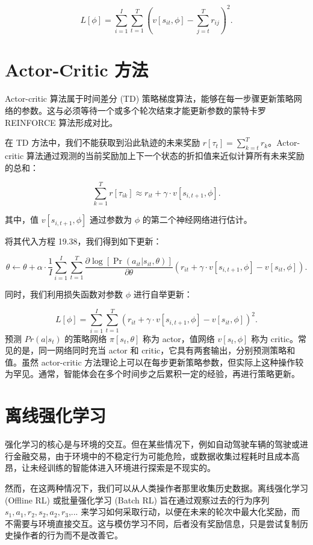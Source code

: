 \[
L[\phi] = \sum_{i=1}^{I} \sum_{t=1}^{T} \left( v[s_{it}, \phi] - \sum_{j=t}^{T} r_{ij} \right)^2. \tag{19.39}
\]

\section{Actor-Critic 方法}
Actor-critic 算法属于时间差分 (TD) 策略梯度算法，能够在每一步骤更新策略网络的参数。这与必须等待一个或多个轮次结束才能更新参数的蒙特卡罗 REINFORCE 算法形成对比。

在 TD 方法中，我们不能获取到沿此轨迹的未来奖励 \(r[\tau_t] = \sum_{k=t}^T r_k\)。Actor-critic 算法通过观测的当前奖励加上下一个状态的折扣值来近似计算所有未来奖励的总和：

\[
\sum_{k=1}^{T} r[\tau_{ik}] \approx r_{it} + \gamma \cdot v[s_{i,t+1}, \phi]. \tag{19.40}
\]

其中，值 \(v[s_{i,t+1}, \phi]\) 通过参数为 \(\phi\) 的第二个神经网络进行估计。

将其代入方程 19.38，我们得到如下更新：

\[
\theta \leftarrow \theta + \alpha \cdot \frac{1}{I} \sum_{i=1}^{I} \sum_{t=1}^{T} \frac{\partial \log[\Pr(a_{it}|s_{it}, \theta)]}{\partial \theta} (r_{it} + \gamma \cdot v[s_{i,t+1}, \phi] - v[s_{it}, \phi]). \tag{19.41}
\]

同时，我们利用损失函数对参数 \(\phi\) 进行自举更新：

\[
L[\phi] = \sum_{i=1}^{I} \sum_{t=1}^{T} \left( r_{it} + \gamma \cdot v[s_{i,t+1}, \phi] - v[s_{it}, \phi] \right)^2. \tag{19.42}
\]
预测 \(Pr(a|s_t)\) 的策略网络 \(\pi[s_t,\theta]\) 称为 actor，值网络 \(v[s_t,\phi]\) 称为 critic。常见的是，同一网络同时充当 actor 和 critic，它具有两套输出，分别预测策略和值。虽然 actor-critic 方法理论上可以在每步更新策略参数，但实际上这种操作较为罕见。通常，智能体会在多个时间步之后累积一定的经验，再进行策略更新。

\section{离线强化学习}
强化学习的核心是与环境的交互。但在某些情况下，例如自动驾驶车辆的驾驶或进行金融交易，由于环境中的不稳定行为可能危险，或数据收集过程耗时且成本高昂，让未经训练的智能体进入环境进行探索是不现实的。

然而，在这两种情况下，我们可以从人类操作者那里收集历史数据。离线强化学习 (Offline RL) 或批量强化学习 (Batch RL) 旨在通过观察过去的行为序列 \(s_1,a_1,r_2,s_2,a_2,r_3\),... 来学习如何采取行动，以便在未来的轮次中最大化奖励，而不需要与环境直接交互。这与模仿学习不同，后者没有奖励信息，只是尝试复制历史操作者的行为而不是改善它。

